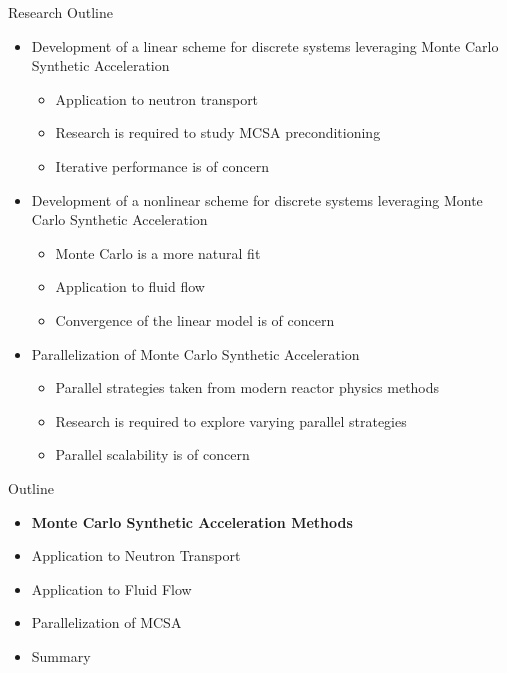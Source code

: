 \documentclass{beamer}
\begin{document}
\begin{frame}{Research Outline}
  \begin{itemize}
  \item Development of a linear scheme for discrete systems leveraging
    Monte Carlo Synthetic Acceleration
    \medskip
    \begin{itemize}
    \item Application to neutron transport
    \item Research is required to study MCSA preconditioning
    \item Iterative performance is of concern
    \end{itemize}
    \bigskip
  \item Development of a nonlinear scheme for discrete systems
    leveraging Monte Carlo Synthetic Acceleration
    \medskip
    \begin{itemize}
    \item Monte Carlo is a more natural fit
    \item Application to fluid flow
    \item Convergence of the linear model is of concern
    \end{itemize}
    \bigskip
  \item Parallelization of Monte Carlo Synthetic Acceleration
    \medskip
    \begin{itemize}
    \item Parallel strategies taken from modern reactor physics
      methods
    \item Research is required to explore varying parallel strategies
    \item Parallel scalability is of concern
    \end{itemize}
  \end{itemize}
\end{frame}

\begin{frame}{Outline}

  \begin{itemize}
  \item \textbf{Monte Carlo Synthetic Acceleration Methods}
    \bigskip
  \item Application to Neutron Transport
    \bigskip
  \item Application to Fluid Flow
    \bigskip
  \item Parallelization of MCSA
    \bigskip
  \item Summary
  \end{itemize}

\end{frame}
\end{document}
